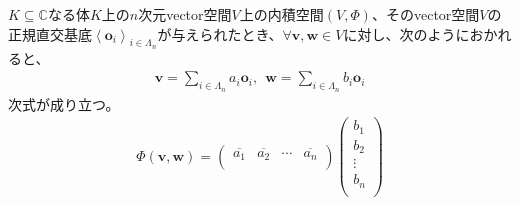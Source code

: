 \documentclass[dvipdfmx]{jsarticle}
\begin{document}
\begin{thm}\label{2.3.6.18}
$K \subseteq \mathbb{C}$なる体$K$上の$n$次元vector空間$V$上の内積空間$(V,\varPhi)$、そのvector空間$V$の正規直交基底$\left\langle \mathbf{o}_{i} \right\rangle_{i \in \varLambda_{n}}$が与えられたとき、$\forall\mathbf{v},\mathbf{w} \in V$に対し、次のようにおかれると、
\begin{align*}
\mathbf{v} = \sum_{i \in \varLambda_{n}} {a_{i}\mathbf{o}_{i}},\ \ \mathbf{w} = \sum_{i \in \varLambda_{n}} {b_{i}\mathbf{o}_{i}}
\end{align*}
次式が成り立つ。
\begin{align*}
\varPhi\left( \mathbf{v},\mathbf{w} \right) = \begin{pmatrix}
\overline{a_{1}} & \overline{a_{2}} & \cdots & \overline{a_{n}} \\
\end{pmatrix}\begin{pmatrix}
b_{1} \\
b_{2} \\
 \vdots \\
b_{n} \\
\end{pmatrix}
\end{align*}
\end{thm}
\end{document}
